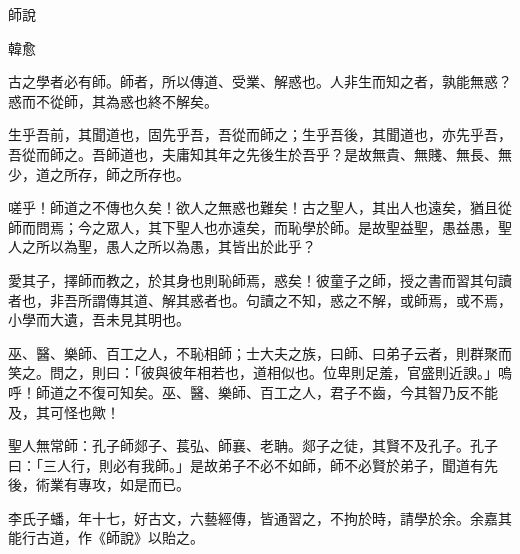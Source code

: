師說

韓愈

古之學者必有師。師者，所以傳道、受業、解惑也。人非生而知之者，孰能無惑？惑而不從師，其為惑也終不解矣。

生乎吾前，其聞道也，固先乎吾，吾從而師之；生乎吾後，其聞道也，亦先乎吾，吾從而師之。吾師道也，夫庸知其年之先後生於吾乎？是故無貴、無賤、無長、無少，道之所存，師之所存也。

嗟乎！師道之不傳也久矣！欲人之無惑也難矣！古之聖人，其出人也遠矣，猶且從師而問焉；今之眾人，其下聖人也亦遠矣，而恥學於師。是故聖益聖，愚益愚，聖人之所以為聖，愚人之所以為愚，其皆出於此乎？

愛其子，擇師而教之，於其身也則恥師焉，惑矣！彼童子之師，授之書而習其句讀者也，非吾所謂傳其道、解其惑者也。句讀之不知，惑之不解，或師焉，或不焉，小學而大遺，吾未見其明也。

巫、醫、樂師、百工之人，不恥相師；士大夫之族，曰師、曰弟子云者，則群聚而笑之。問之，則曰：「彼與彼年相若也，道相似也。位卑則足羞，官盛則近諛。」嗚呼！師道之不復可知矣。巫、醫、樂師、百工之人，君子不齒，今其智乃反不能及，其可怪也歟！

聖人無常師：孔子師郯子、萇弘、師襄、老聃。郯子之徒，其賢不及孔子。孔子曰：「三人行，則必有我師。」是故弟子不必不如師，師不必賢於弟子，聞道有先後，術業有專攻，如是而已。

李氏子蟠，年十七，好古文，六藝經傳，皆通習之，不拘於時，請學於余。余嘉其能行古道，作《師說》以貽之。
